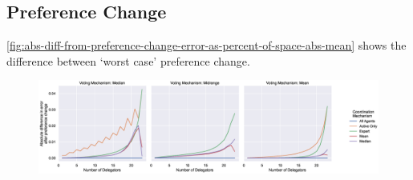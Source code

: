 \subsection{Preference Change}\label{subsec:results-shift}
\autoref{fig:abs-diff-from-preference-change-error-as-percent-of-space-abs-mean} shows
the difference between `worst case' preference change.


\begin{landscape}
    \begin{figure}[p]
        \centering
        \includegraphics[scale=0.55]
        {content/chapter2/figures/abs_diff_from_preference_change_error_as_percent_of_space_abs_mean}
        \caption{
        }
        \label{fig:abs-diff-from-preference-change-error-as-percent-of-space-abs-mean}
    \end{figure}
\end{landscape}

